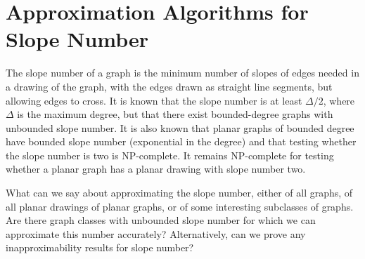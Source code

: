 \documentclass{patmorin}
\begin{document}
\section{Approximation Algorithms for Slope Number}

The slope number of a graph is the minimum number of slopes of edges
needed in a drawing of the graph, with the edges drawn as straight line
segments, but allowing edges to cross. It is known that the slope number
is at least $\Delta/2$, where $\Delta$ is the maximum degree, but that
there exist bounded-degree graphs with unbounded slope number. It is
also known that planar graphs of bounded degree have bounded slope number
(exponential in the degree) and that testing whether the slope number is
two is NP-complete. It remains NP-complete for testing whether a planar
graph has a planar drawing with slope number two.

\begin{op}
  What can we say about approximating the slope number, either of all
  graphs, of all planar drawings of planar graphs, or of some interesting
  subclasses of graphs. Are there graph classes with unbounded slope number
  for which we can approximate this number accurately? Alternatively,
  can we prove any inapproximability results for slope number?
\end{op}
\end{document}
